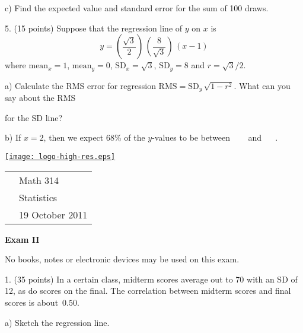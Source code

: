 \documentclass[10pt]{article}
\begin{document}
\hspace{20pt} c) Find the expected value %
and standard error %
for the sum of 100 draws.
\vspace{1.25in}

5. (15 points) Suppose that the regression line of $y$ on $x$ 
is \[y=\left(\frac{\sqrt{3}}{2}\right)\,\left(\frac{8}{\sqrt{3}}\right)\,(x-1)\] 
where $\mbox{mean}_x=1$, $\mbox{mean}_y=0$, $\mbox{SD}_x=\sqrt{3}$, $\mbox{SD}_y=8$
and $r=\sqrt{3}/2$.\vspace{3pt}

\hspace{20pt} a) Calculate the RMS error for regression 
$\mbox{RMS}=\mbox{SD}_y\,\sqrt{1-r^2}$.  What can you say about the RMS\vspace{-4pt}

\hspace{20pt}\hphantom{b) } for the SD line?
\vspace{1.2in}

\hspace{20pt} b) If $x=2$, then we expect 68\% of the $y$-values to be
between \ \underline{\hspace{20pt}} \ \ and \  \underline{\hspace{20pt}} \ .

\vfill
\eject

\href{http://www.shepherd.edu}{\texttt{[image: logo-high-res.eps]}}
\vspace{-1.69cm}

{\small
\begin{tabular}{cl}
& Math 314\\
& Statistics\\
\hspace{5.28in} & 19 October 2011
\end{tabular}
}
\setlength{\baselineskip}{1.05\baselineskip}

\begin{center}
\textbf{\large  Exam II}
\end{center}
No books, notes or electronic devices may be used on this exam.
\medskip

1. (35 points) In a certain class, midterm scores average out to 70 with an SD of 12, as do 
scores on the final.  The correlation between midterm scores and final scores is 
about~$0.50$.   

\hspace{20pt} a) Sketch the regression line. %
\vspace{1.25in}
\end{document}
